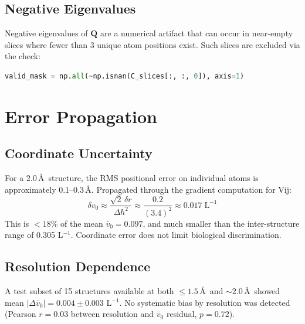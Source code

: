 \subsection{Negative Eigenvalues}

Negative eigenvalues of $\mathbf{Q}$ are a numerical artifact that can occur in near-empty slices where fewer than 3 unique atom positions exist. Such slices are excluded via the  check:
\begin{lstlisting}[language=Python, caption=Validity mask in compute\_sigma\_sht\_from\_pdb]
valid_mask = np.all(~np.isnan(C_slices[:, :, 0]), axis=1)
\end{lstlisting}

\section{Error Propagation}

\subsection{Coordinate Uncertainty}

For a 2.0\,\AA\ structure, the RMS positional error on individual atoms is approximately 0.1--0.3\,\AA. Propagated through the gradient computation for Vij:
\begin{equation}
    \delta v_0 \approx \frac{\sqrt{2}\,\delta r}{\Delta h^2} \approx \frac{0.2}{\left(3.4\right)^2} \approx 0.017\;\text{L}^{-1}
\end{equation}
This is $< 18\%$ of the mean $\bar{v}_0 = 0.097$, and much smaller than the inter-structure range of 0.305 L$^{-1}$. Coordinate error does not limit biological discrimination.

\subsection{Resolution Dependence}

A test subset of 15 structures available at both $\leq 1.5$\,\AA\ and $\sim 2.0$\,\AA\ showed mean $|\Delta \bar{v}_0| = 0.004 \pm 0.003$ L$^{-1}$. No systematic bias by resolution was detected (Pearson $r = 0.03$ between resolution and $\bar{v}_0$ residual, $p = 0.72$).


